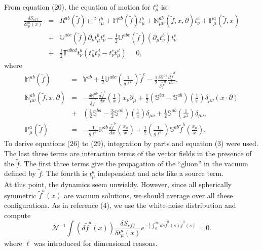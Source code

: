 \documentclass[a4paper,12pt]{article}
\begin{document}
From equation (20), the equation of motion for $t^{a}_{\mu}$ is:
\begin{eqnarray}\label{15}
\frac{\delta S_{eff}}{\delta t^{a}_{\mu}(x)}&=& R^{ab}(\tilde{f})\Box^{2}t^{b}_{\mu}+\mathbb{M}^{ab}(\tilde{f})t^{b}_{\mu}+\mathbb{N}^{ab}_{\mu\nu}(\tilde{f},x,\partial)t^{b}_{\nu}+\mathbb{P}^{a}_{\mu}(\tilde{f},x)\nonumber\\
&+&\mathbb{U}^{abc}(\tilde{f})\partial_{\nu}t^{b}_{\mu}t^{c}_{\nu}-\frac{1}{2}\mathbb{U}^{abc}(\tilde{f})(\partial_{\mu}t^{b}_{\nu})t^{c}_{\nu}\nonumber\\
&+&\frac{1}{2}\mathbb{T}^{abcd}t^{b}_{\nu}(t^{c}_{\mu}t^{d}_{\nu}-t^{c}_{\nu}t^{d}_{\mu}) = 0,
\end{eqnarray}
where
\begin{eqnarray}\label{16}
\mathbb{M}^{ab}(\tilde{f}) &=& \mathbb{Y}^{ab}+\frac{1}{2}\mathbb{U}^{abc}(\frac{1}{g\ell^{2}})\tilde{f}^{c}-\frac{1}{2}\frac{\delta \mathbb{S}^{ab}}{\delta\tilde{f}^{d}}\frac{d\tilde{f}^{d}}{dx},\\
\mathbb{N}^{ab}_{\mu\nu}(\tilde{f},x,\partial) &=& -\frac{\delta\mathbb{R}^{ab}}{\delta\tilde{f}^{c}}\frac{d\tilde{f}^{c}}{dx}(\frac{1}{x})x_{\nu}\partial_{\mu}+\frac{1}{2}(\mathbb{S}^{ba}-\mathbb{S}^{ab})(\frac{1}{x})\delta_{\mu\nu}(x\cdot\partial)\nonumber\\
&+&(\frac{1}{2}\mathbb{S}^{ba}-\frac{3}{2}\mathbb{S}^{ab})(\frac{1}{x})\delta_{\mu\nu}+\frac{1}{2}\mathbb{S}^{ab}(\frac{1}{x^{2}})\delta_{\mu\nu},\\
\mathbb{P}^{a}_{\mu}(\tilde{f}) &=& -\frac{1}{g\ell^{2}}\mathbb{R}^{ab}\frac{d\tilde{f}^{b}}{dx}(\frac{x_{\mu}}{x})+\frac{1}{2}(\frac{1}{g\ell^{2}})\mathbb{S}^{ab}\tilde{f}^{b}(\frac{x_{\mu}}{x}).
\end{eqnarray}
To derive equations (26) to (29), integration by parts and equation (3) were used.  The last three terms are interaction terms of the vector fields in the presence of the $\tilde{f}$.  The first three terms give the propagation of the ``gluon'' in the vacuum defined by $\tilde{f}$.  The fourth is $t^{a}_{\mu}$ independent and acts like a source term.\\

At this point, the dynamics seem unwieldy.  However, since all spherically symmetric $\tilde{f}^{a}(x)$ are vacuum solutions, we should average over all these configurations.  As in reference (4), we use the white-noise distribution and compute
\begin{equation}\label{17}
\mathcal{N}^{-1}\int(d\tilde{f}^{a}(x))\frac{\delta S_{eff}}{\delta t^{a}_{\mu}(x)}e^{-\frac{1}{\ell}\int^{\infty}_{0}ds\tilde{f}^{a}(s)\tilde{f}^{a}(s)} = 0.
\end{equation}
where $\ell$ was introduced for dimensional reasons.\\
\end{document}
